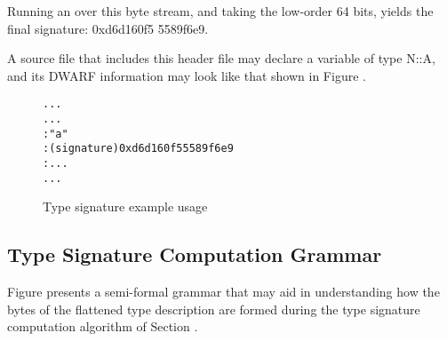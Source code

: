 Running an  over this byte stream, and taking the
low-order 64 bits, yields the final signature: 0xd6d160f5
5589f6e9.


A source file that includes this header file may declare a
variable of type N::A, and its DWARF information may look
like that shown in 
Figure .

\begin{figure}
\begin{dwflisting}
\begin{alltt}
  ...
    ...
       : "a"
       : (signature) 0xd6d160f5 5589f6e9
       : ...
    ...
\end{alltt}
\end{dwflisting}
\caption{Type signature example usage}
\label{fig:typesignatureexampleusage}
\end{figure}

\subsection{Type Signature Computation Grammar}
\label{app:typesignaturecomputationgrammar}

Figure 
presents a semi-formal grammar that may aid in understanding
how the bytes of the flattened type description are formed
during the type signature computation algorithm of
Section . 

